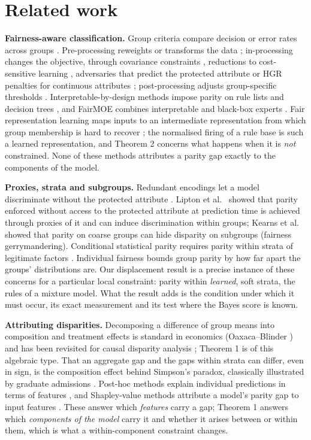 \documentclass[pdflatex,sn-basic,Numbered,lineno]{sn-jnl}
\begin{document}
\hypertarget{related-work}{%
\section{Related work}\label{related-work}}

\textbf{Fairness-aware classification.} Group criteria compare decision or error rates across groups \cite{mehrabi,pessach}. Pre-processing reweights or transforms the data \cite{kamiran}; in-processing changes the objective, through covariance constraints \cite{zafar}, reductions to cost-sensitive learning \cite{agarwal}, adversaries that predict the protected attribute \cite{zhang} or HGR penalties for continuous attributes \cite{mary}; post-processing adjusts group-specific thresholds \cite{hardt}. Interpretable-by-design methods impose parity on rule lists \cite{aivodji} and decision trees \cite{barata}, and FairMOE combines interpretable and black-box experts \cite{fairmoe}. Fair representation learning maps inputs to an intermediate representation from which group membership is hard to recover \cite{zemel}; the normalised firing of a rule base is such a learned representation, and Theorem 2 concerns what happens when it is \emph{not} constrained. None of these methods attributes a parity gap exactly to the components of the model.

\textbf{Proxies, strata and subgroups.} Redundant encodings let a model discriminate without the protected attribute \cite{pedreschi}. Lipton et al.~\cite{lipton} showed that parity enforced without access to the protected attribute at prediction time is achieved through proxies of it and can induce discrimination within groups; Kearns et al.~\cite{kearns} showed that parity on coarse groups can hide disparity on subgroups (fairness gerrymandering). Conditional statistical parity requires parity within strata of legitimate factors \cite{kamiran2013,corbett}. Individual fairness \cite{dwork} bounds group parity by how far apart the groups' distributions are. Our displacement result is a precise instance of these concerns for a particular local constraint: parity within \emph{learned}, soft strata, the rules of a mixture model. What the result adds is the condition under which it must occur, its exact measurement and its test where the Bayes score is known.

\textbf{Attributing disparities.} Decomposing a difference of group means into composition and treatment effects is standard in economics (Oaxaca--Blinder \cite{oaxaca,blinder}) and has been revisited for causal disparity analysis \cite{opacic}; Theorem 1 is of this algebraic type. That an aggregate gap and the gaps within strata can differ, even in sign, is the composition effect behind Simpson's paradox, classically illustrated by graduate admissions \cite{bickel}. Post-hoc methods explain individual predictions in terms of features \cite{lime,shap,guidotti}, and Shapley-value methods attribute a model's parity gap to input features \cite{begley}. These answer which \emph{features} carry a gap; Theorem 1 answers which \emph{components of the model} carry it and whether it arises between or within them, which is what a within-component constraint changes.
\end{document}
